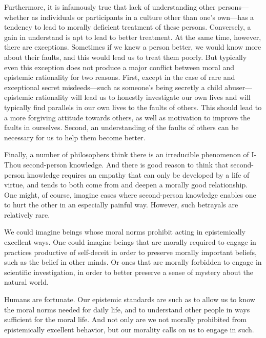 Furthermore, it is infamously true that lack of understanding other persons---whether as individuals or participants in 
a culture other than one's own---has a tendency to lead to morally deficient treatment of these persons. Conversely, a 
gain in understand is apt to lead to better treatment. At the same time, however, there are exceptions. Sometimes if we 
knew a person better, we would know more about their faults, and this would lead us to treat them poorly. But typically 
even this exception does not produce a major conflict between moral and epistemic rationality for two reasons. First, 
except in the case of rare and exceptional secret misdeeds---such as someone's being secretly a child 
abuser---epistemic rationality will lead us to honestly investigate our own lives and will typically find parallels in 
our own lives to the faults of others. This should lead to a more forgiving attitude towards others, as well as motivation
to improve the faults in ourselves. Second, an understanding of the faults of others can be necessary for us to help them 
become better.

Finally, a number of philosophers think there is an irreducible phenomenon of I-Thou second-person knowledge. And there is good
reason to think that second-person knowledge requires an empathy that can only be developed by a life of virtue, and 
tends to both come from and deepen a morally good relationship. One might, of course, imagine cases where second-person 
knowledge enables one to hurt the other in an especially painful way. However, such betrayals are relatively rare.

We could imagine beings whose moral norms prohibit acting in epistemically excellent ways. One could imagine
beings that are morally required to engage in practices productive of self-deceit in order to preserve morally important
beliefs, such as the belief in other minds. Or ones that are morally forbidden to engage in scientific investigation,
in order to better preserve a sense of mystery about the natural world.

Humans are fortunate. Our epistemic standards are such as to allow us to know the moral norms needed for daily life, 
and to understand other people in ways sufficient for the moral life. And not only are we not morally prohibited from 
epistemically excellent behavior, but our morality calls on us to engage in such.

